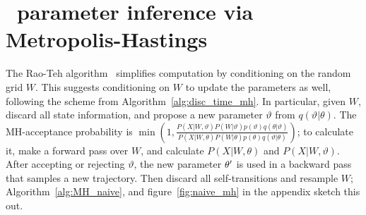 \vspace{-.1in}
\section{\Naive\ parameter inference via Metropolis-Hastings}
The Rao-Teh algorithm~\cite{RaoTeh13} simplifies
computation by conditioning on the
random grid $W$.
This suggests conditioning on $W$ to update
the parameters as well, following the scheme from
Algorithm~\ref{alg:disc_time_mh}.
In particular, given $W$, discard all state information, and propose a 
new parameter $\vartheta$ from $q(\vartheta|\theta)$. 
The MH-acceptance probability is $\min\left(1,
\frac{P(X|W,\vartheta)P(W|\vartheta)p(\vartheta)q(\theta|\vartheta)}
     {P(X|W,\theta)P(W|\theta)p(\theta)q(\vartheta|\theta)}\right)$; 
     to calculate it,
make a forward pass over $W$, and calculate 
$P(X|W,\theta)$ and $P(X|W,\vartheta)$. %
After accepting or rejecting $\vartheta$, the new parameter $\theta'$ is used in
a backward pass that samples a new trajectory. Then discard all 
self-transitions and resample $W$; Algorithm~\ref{alg:MH_naive}, and 
figure~\ref{fig:naive_mh} in the appendix sketch this out.

